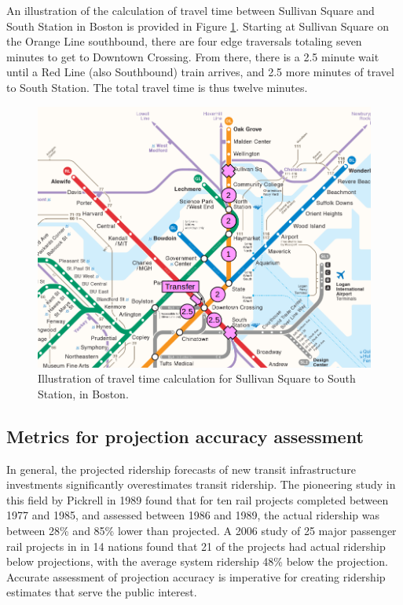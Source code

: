 \documentclass{article}
\begin{document}
An illustration of the calculation of travel time between Sullivan Square and South Station in Boston is provided in Figure \ref{fig:f2}. Starting at Sullivan Square on the Orange Line southbound, there are four edge traversals totaling seven minutes to get to Downtown Crossing. From there, there is a 2.5 minute wait until a Red Line (also Southbound) train arrives, and 2.5 more minutes of travel to South Station. The total travel time is thus twelve minutes. 

\begin{figure}[H]
\begin{center}\includegraphics[scale=0.75]{transfer_demonstration}\end{center}\caption{Illustration of travel time calculation for Sullivan Square to South Station, in Boston.}\label{fig:f2}
\end{figure}

\subsection{Metrics for projection accuracy assessment}

In general, the projected ridership forecasts of new transit infrastructure investments significantly overestimates transit ridership. The pioneering study in this field by Pickrell in 1989 \cite{Pickrell1989} found that for ten rail projects completed between 1977 and 1985, and assessed between 1986 and 1989, the actual ridership was between 28\% and 85\% lower than projected. A 2006 study \cite{Flyvbjerg2006} of 25 major passenger rail projects in  in 14 nations found that 21 of the projects had actual ridership below projections, with the average system ridership 48\% below the projection. Accurate assessment of projection accuracy is imperative for creating ridership estimates that serve the public interest.
\end{document}
